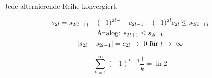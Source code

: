 \begin{satz*}
	Jede alternierende Reihe konvergiert.\\
	\begin{bew}
		\begin{gather*}
			s_{2l} = s_{2(l-1)} + (-1)^{2l-1} \cdot c_{2l-1} + (-1)^{2l} c_{2l} \leq s_{2(l-1)} \\
			\text{Analog: } s_{2l+1} \leq s_{2l-1} \\
			\abs{s_{2l} - s_{2l-1}} = c_{2l} \rightarrow 0 \text{ für } l \rightarrow \infty
		\end{gather*}
	\end{bew}
\end{satz*}
\begin{bsp*}[note = Alternierende harmonische Reihe]
	\[ \sum_{k=1}^\infty (-1)^{k-1} \frac{1}{k} = \ln 2 \]
\end{bsp*}

